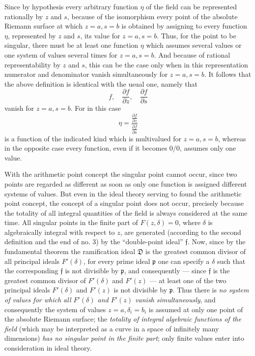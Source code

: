 \documentclass[11pt]{article}
\providecommand{\p}{\partial}
\providecommand{\frp}{\mathfrak p}
\providecommand{\frf}{\mathfrak f}
\providecommand{\frD}{\mathfrak D}
\begin{document}
Since by hypothesis every arbitrary function \(\eta\) of the field can be represented rationally by \(z\) and \(s\), because of the isomorphism every point of the absolute Riemann surface at which \(z=a,s=b\) is obtained by assigning to every function \(\eta\), represented by \(z\) and \(s\), its value for \(z=a,s=b\). Thus, for the point to be singular, there must be at least one function \(\eta\) which assumes several values or one system of values several times for \(z=a,s=b\). And because of rational representability by \(z\) and \(s\), this can be the case only when in this representation numerator and denominator vanish simultaneously for \(z=a,s=b\). It follows that the above definition is identical with the usual one, namely that
\[
f,\quad \frac{\p f}{\p z},\quad \frac{\p f}{\p s}
\]
vanish for \(z=a,s=b\). For in this case
\[
\eta=\frac{\frac{\p f}{\p z}}{\frac{\p f}{\p s}}
\]
is a function of the indicated kind which is multivalued for \(z=a,s=b\), whereas in the opposite case every function, even if it becomes \(0/0\), assumes only one value.

With the arithmetic point concept the singular point cannot occur, since two points are regarded as different as soon as only one function is assigned different systems of values. But even in the ideal theory serving to found the arithmetic point concept, the concept of a singular point does not occur, precisely because the totality of all integral quantities of the field is always considered at the same time. All singular points in the finite part of \(F(z,\delta)=0\), where \(\delta\) is algebraically integral with respect to \(z\), are generated (according to the second definition and the end of no. 3) by the ``double-point ideal'' \(\frf\). Now, since by the fundamental theorem the ramification ideal \(\frD\) is the greatest common divisor of all principal ideals \(F'(\delta)\), for every prime ideal \(\frp\) one can specify a \(\delta\) such that the corresponding \(\frf\) is not divisible by \(\frp\), and consequently --- since \(\frf\) is the greatest common divisor of \(F'(\delta)\) and \(F'(z)\) --- at least one of the two principal ideals \(F'(\delta)\) and \(F'(z)\) is not divisible by \(\frp\). Thus there is \emph{no system of values for which all \(F'(\delta)\) and \(F'(z)\) vanish simultaneously}, and consequently the system of values \(z=a,\delta_i=b_i\) is assumed at only one point of the absolute Riemann surface; the \emph{totality of integral algebraic functions of the field} (which may be interpreted as a curve in a space of infinitely many dimensions) \emph{has no singular point in the finite part}; only finite values enter into consideration in ideal theory.
\end{document}
